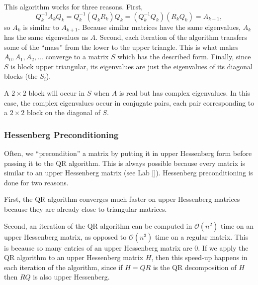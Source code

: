 This algorithm works for three reasons. First,
\[
Q_k^{-1}A_kQ_k = Q_k^{-1}(Q_kR_k)Q_k = (Q_k^{-1}Q_k)(R_kQ_k) = A_{k+1},
\]
so $A_k$ is similar to $A_{k+1}$.
Because similar matrices have the same eigenvalues, $A_k$ has the same eigenvalues as $A$.
Second, each iteration of the algorithm transfers some of the ``mass'' from the lower to the upper triangle.
This is what makes $A_0, A_1, A_2, \ldots$ converge to a matrix $S$ which has the described form.
Finally, since $S$ is block upper triangular, its eigenvalues are just the eigenvalues of its diagonal blocks (the $S_i$).

A $2 \times 2$ block will occur in $S$ when $A$ is real but has complex eigenvalues.
In this case, the complex eigenvalues occur in conjugate pairs, each pair corresponding to a $2 \times 2$ block on the diagonal of $S$.

\subsubsection*{Hessenberg Preconditioning} %

Often, we ``precondition'' a matrix by putting it in upper Hessenberg form before passing it to the QR algorithm.
This is always possible because every matrix is similar to an upper Hessenberg matrix (see Lab \ref{}).
Hessenberg preconditioning is done for two reasons.

First, the QR algorithm converges much faster on upper Hessenberg matrices because they are already close to triangular matrices.

Second, an iteration of the QR algorithm can be computed in $\mathcal{O}(n^2)$ time on an upper Hessenberg matrix, as opposed to $\mathcal{O}(n^3)$ time on a regular matrix.
This is because so many entries of an upper Hessenberg matrix are 0.
If we apply the QR algorithm to an upper Hessenberg matrix $H$, then this speed-up happens in each iteration of the algorithm, since if $H = QR$ is the QR decomposition of $H$ then $RQ$ is also upper Hessenberg.


